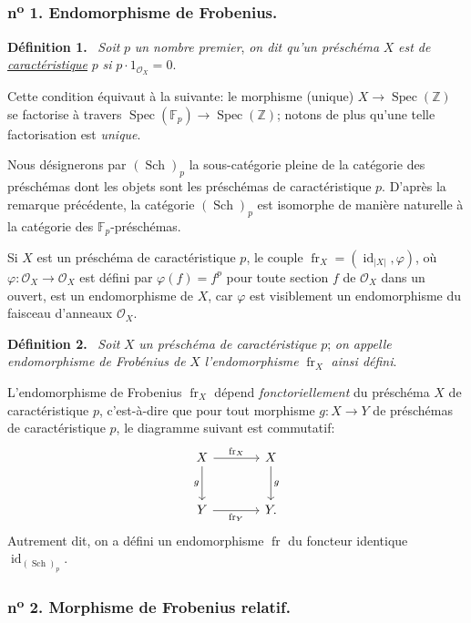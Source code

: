 \documentclass[11pt]{article}
\newenvironment{statement}[1]{\par\medskip\noindent\textbf{#1.}\ }{\par\medskip}
\DeclareMathOperator{\Spec}{Spec}
\providecommand{\OO}{\mathcal{O}}
\providecommand{\id}{\operatorname{id}}
\providecommand{\id}{\operatorname{id}}
\providecommand{\id}{\operatorname{id}}
\providecommand{\id}{\operatorname{id}}
\providecommand{\Spec}{\operatorname{Spec}}
\providecommand{\Spec}{\operatorname{Spec}}
\providecommand{\id}{\operatorname{id}}
\providecommand{\Spec}{\operatorname{Spec}}
\providecommand{\fr}{\operatorname{fr}}
\providecommand{\Sch}{\operatorname{Sch}}
\providecommand{\bF}{\mathbb F}
\providecommand{\bbZ}{\mathbb Z}
\providecommand{\fr}{\operatorname{fr}}
\providecommand{\Sch}{\operatorname{Sch}}
\providecommand{\Spec}{\operatorname{Spec}}
\providecommand{\id}{\operatorname{id}}
\begin{document}
\subsubsection*{n\textsuperscript{o} 1. Endomorphisme de Frobenius.}

\begin{statement}{Définition 1}
\emph{Soit} $p$ \emph{un nombre premier}, \emph{on dit qu'un préschéma} $X$ \emph{est de \underline{caractéristique}} $p$ \emph{si} $p\cdot 1_{\OO_X}=0$.
\end{statement}

Cette condition équivaut à la suivante: le morphisme (unique) $X\to\Spec(\bbZ)$ se factorise à travers $\Spec(\bF_p)\to\Spec(\bbZ)$; notons de plus qu'une telle factorisation est \emph{unique}.

Nous désignerons par $(\Sch)_p$ la sous-catégorie pleine de la catégorie des préschémas dont les objets sont les préschémas de caractéristique $p$. D'après la remarque précédente, la catégorie $(\Sch)_p$ est isomorphe de manière naturelle à la catégorie des $\bF_p$-préschémas.

Si $X$ est un préschéma de caractéristique $p$, le couple $\fr_X=(\id_{|X|},\varphi)$, où $\varphi:\OO_X\longrightarrow\OO_X$ est défini par $\varphi(f)=f^p$ pour toute section $f$ de $\OO_X$ dans un ouvert, est un endomorphisme de $X$, car $\varphi$ est visiblement un endomorphisme du faisceau d'anneaux $\OO_X$.

\begin{statement}{Définition 2}
\emph{Soit} $X$ \emph{un préschéma de caractéristique} $p$; \emph{on appelle endomorphisme de Frobénius de} $X$ \emph{l'endomorphisme} $\fr_X$ \emph{ainsi défini}.
\end{statement}

L'endomorphisme de Frobenius $\operatorname{fr}_X$ dépend \emph{fonctoriellement} du préschéma $X$ de caractéristique $p$, c'est-à-dire que pour tout morphisme $g:X\to Y$ de préschémas de caractéristique $p$, le diagramme suivant est commutatif:
\[
\begin{tikzcd}[column sep=large,row sep=large]
X \arrow[r,"\fr_X"] \arrow[d,"g"'] & X \arrow[d,"g"]\\
Y \arrow[r,"\fr_Y"'] & Y.
\end{tikzcd}
\]
Autrement dit, on a défini un endomorphisme $\fr$ du foncteur identique $\id_{(\Sch)_p}$.

\subsubsection*{n\textsuperscript{o} 2. Morphisme de Frobenius relatif.}
\end{document}
